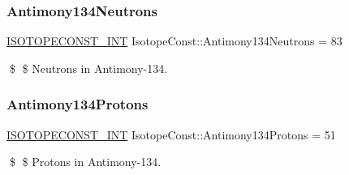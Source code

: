 \subsubsection{\texorpdfstring{Antimony134\+Neutrons}{Antimony134Neutrons}}
{\footnotesize\ttfamily \mbox{\hyperlink{group___isotope_const-_macros_ga5f18360b3e99483a35c32d789e62621c}{I\+S\+O\+T\+O\+P\+E\+C\+O\+N\+S\+T\+\_\+\+I\+NT}} Isotope\+Const\+::\+Antimony134\+Neutrons = 83}

\$ \$ Neutrons in Antimony-\/134. \mbox{\label{group___isotope_const-_antimony-_sb134_gaeaa3a28e4d0517948fd53223194ff0a3}} 
\subsubsection{\texorpdfstring{Antimony134\+Protons}{Antimony134Protons}}
{\footnotesize\ttfamily \mbox{\hyperlink{group___isotope_const-_macros_ga5f18360b3e99483a35c32d789e62621c}{I\+S\+O\+T\+O\+P\+E\+C\+O\+N\+S\+T\+\_\+\+I\+NT}} Isotope\+Const\+::\+Antimony134\+Protons = 51}

\$ \$ Protons in Antimony-\/134. 
